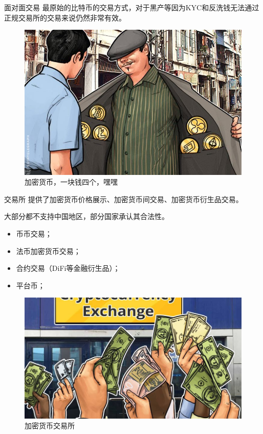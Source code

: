 \documentclass[11pt]{beamer}
\begin{document}
\begin{frame}{面对面交易}
	最原始的比特币的交易方式，对于黑产等因为KYC和反洗钱无法通过正规交易所的交易来说仍然非常有效。
	\begin{figure}
		\centering
		\includegraphics[width=0.6\linewidth]{figures/btcFaceToFace}
		\caption{加密货币，一块钱四个，嘿嘿}
		\label{fig:btcfacetoface}
	\end{figure}
	
\end{frame}

\begin{frame}{交易所}
	提供了加密货币价格展示、加密货币间交易、加密货币衍生品交易。
	
	大部分都不支持中国地区，部分国家承认其合法性。
	\begin{itemize}
		\item 币币交易；
		\item 法币加密货币交易；
		\item 合约交易（DiFi等金融衍生品）；
		\item 平台币；
	\end{itemize}

\begin{figure}
	\centering
	\includegraphics[width=0.6\linewidth,height=0.4\textheight]{figures/exchange}
	\caption{加密货币交易所}
	\label{fig:exchange}
\end{figure}

\end{frame}
\end{document}

